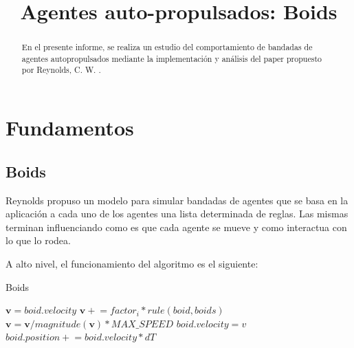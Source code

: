 \documentclass[a4paper]{article}
\title{{\centering\huge {Agentes auto-propulsados: Boids}}}
\begin{document}
\begin{titlingpage}
    \maketitle
    \begin{abstract}
        En el presente informe, se realiza un estudio del comportamiento de bandadas de agentes autopropulsados mediante la implementación y análisis del paper propuesto por Reynolds, C. W. \cite{BoidsPaper}.
    \end{abstract}
\end{titlingpage}

    \tableofcontents
    \newpage

    \section{Fundamentos}
        \subsection{Boids}
            Reynolds propuso un modelo para simular bandadas de agentes que se basa en la aplicación a cada uno de los agentes una lista determinada de reglas. Las mismas terminan influenciando como es que cada agente se mueve y como interactua con lo que lo rodea.

            A alto nivel, el funcionamiento del algoritmo es el siguiente:

            \begin{algorithm}
                \caption{Boids}\label{pseudo:boids}
                \begin{algorithmic}[1]
                        \State $\bm{v} = boid.velocity$
                            \State $\bm{v} \mathrel{+}= factor_i * rule(boid, boids)$
                        \EndFor
                            \State $\bm{v} = \bm{v} / magnitude(\bm{v}) * MAX\_SPEED$
                        \EndIf
                        \State $boid.velocity = v$
                        \State $boid.position \mathrel{+}= boid.velocity * dT$
                    \EndFor
                \EndProcedure
                \end{algorithmic}
            \end{algorithm}
\end{document}
